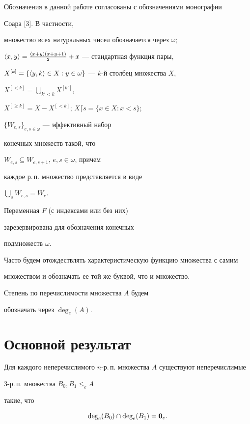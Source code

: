 Обозначения в данной работе согласованы с обозначениями монографии


Соара [3]. В частности,


множество всех натуральных чисел обозначается через $\omega$;


${\langle x,y \rangle}=\frac{(x+y)(x+y+1)}{2}+x$ --- стандартная функция пары,


$X^{[k]}=\{{\langle y,k \rangle}\in X: y\in \omega\}$ --- $k$-й столбец множества $X$,


$X^{[<k]}=\bigcup_{k'<k}X^{[k']}$,


$X^{[\ge k]}=X-X^{[<k]}$; $X\lceil s=\{x\in X: x<s\}$; 


$\{W_{e,s}\}_{e,s\in\omega}$ --- эффективный набор 


конечных множеств такой, что


$W_{e,s}\subseteq W_{e,s+1}$, $e,s\in\omega$, причем 


каждое р.\,п. множество представляется в виде


$\bigcup\limits_s W_{e,s}=W_e$. 


Переменная $F$ (с индексами или без них)


зарезервирована для обозначения конечных


подмножеств $\omega$.


Часто будем отождествлять характеристическую функцию множества с самим


множеством и обозначать ее той же буквой, что и множество.





Степень по перечислимости множества $A$ будем 


обозначать через $\deg_e(A)$.





\section{Основной результат}





\begin{thmnonum}


Для каждого неперечислимого $n$-р.\,п. множества $A$ существуют неперечислимые


$3$-р.\,п. множества $B_0, B_1\le_e A$


такие, что


$$


\deg_e(B_0) \cap \deg_e(B_1)=\dg 0_e.


$$


\end{thmnonum}





